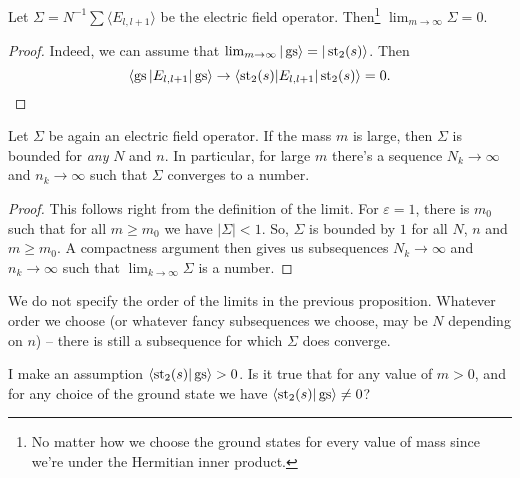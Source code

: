 \begin{corp}
Let $\Sigma = N^{-1}\sum \langle E_{l,l+1} \rangle$ be the electric field operator. Then\footnote{No matter how we choose the ground states for every value of mass since we're under the Hermitian inner product.} $\lim_{m \rightarrow \infty} \Sigma = 0$.
\end{corp}
\begin{proof}
Indeed, we can assume that $\lim_{m \rightarrow \infty} |\operatorname{gs}\rangle = |\operatorname{st}_2(s)\rangle$. Then 
\[
\langle \operatorname{gs} | E_{l,l+1} | \operatorname{gs} \rangle \rightarrow \langle \operatorname{st}_2(s) | E_{l,l+1}|\operatorname{st}_2(s)\rangle = 0.\qedhere
\]
\end{proof}
\begin{corp}
Let $\Sigma$ be again an electric field operator. If the mass $m$ is large, then $\Sigma$ is bounded for \emph{any} $N$ and $n$. In particular, for large $m$ there's a sequence $N_k \rightarrow \infty$ and $n_k \rightarrow \infty$ such that $\Sigma$ converges to a number.
\end{corp}
\begin{proof}
This follows right from the definition of the limit. For $\varepsilon = 1$, there is $m_0$ such that for all $m \geq m_0$ we have $|\Sigma| < 1$. So, $\Sigma$ is bounded by $1$ for all $N$, $n$ and $m \geq m_0$. A compactness argument then gives us subsequences $N_k \rightarrow \infty$ and $n_k \rightarrow \infty$ such that $\lim_{k \rightarrow \infty} \Sigma$ is a number.
\end{proof}
We do not specify the order of the limits in the previous proposition. Whatever order we choose (or whatever fancy subsequences we choose, may be $N$ depending on $n$) -- there is still a subsequence for which $\Sigma$ does converge. 

\begin{quest}
I make an assumption $\langle \operatorname{st}_2(s)|\operatorname{gs} \rangle > 0$. Is it true that for any value of $m > 0$, and for any choice of the ground state we have $\langle \operatorname{st}_2(s)|\operatorname{gs} \rangle \neq 0$?
\end{quest}

